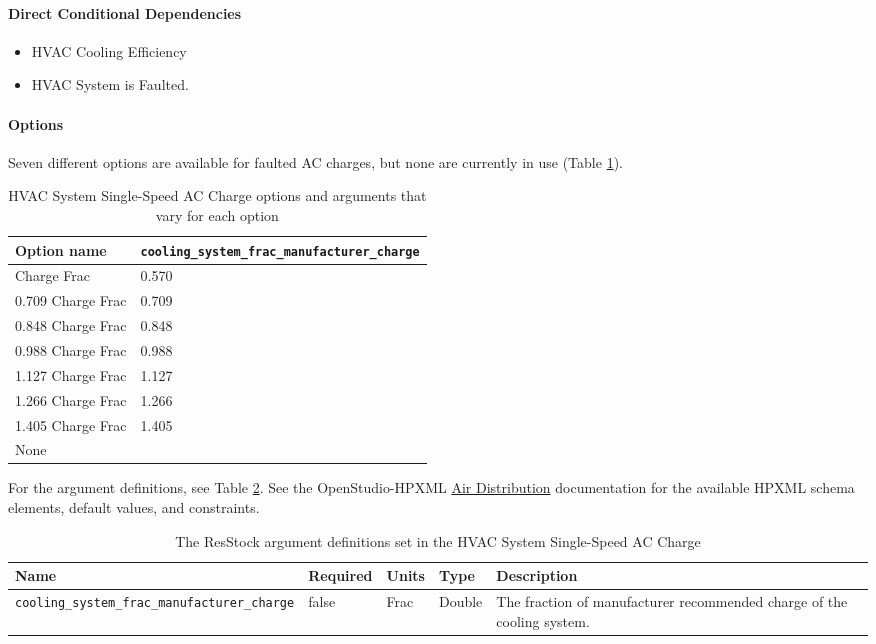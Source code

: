 \paragraph{Direct Conditional Dependencies}
\begin{itemize}
    \item HVAC Cooling Efficiency
    \item HVAC System is Faulted.
\end{itemize}

\paragraph{Options}
Seven different options are available for faulted AC charges, but none are currently in use (Table \ref{table:hc_opt_ss_ac_charge}). 

\begin{longtable}[]{|p{3.5cm}|p{6cm}|}\caption{HVAC System Single-Speed AC Charge options and arguments that vary for each option} \label{table:hc_opt_ss_ac_charge} \\
\toprule\noalign{}
Option name &
\texttt{cooling\_system\_frac\_manufacturer\_charge} \\
\midrule\noalign{}
\endhead
\bottomrule\noalign{}
\endlastfoot
0.570 Charge Frac & 0.570 \\
0.709 Charge Frac & 0.709 \\
0.848 Charge Frac & 0.848 \\
0.988 Charge Frac & 0.988 \\
1.127 Charge Frac & 1.127 \\
1.266 Charge Frac & 1.266 \\
1.405 Charge Frac & 1.405 \\
None & \\
\end{longtable}

For the argument definitions, see Table \ref{table:hc_arg_def_hvac_ss_ac_charge}. See the OpenStudio-HPXML \href{https://openstudio-hpxml.readthedocs.io/en/v1.8.1/workflow_inputs.html#hpxml-air-distribution}{Air Distribution} documentation for the available HPXML schema elements, default values, and constraints.

\begin{longtable}[]{|p{3.5cm}|p{1.5cm}|p{1.3cm}|p{1.1cm}|p{3.3cm}|} \caption{The ResStock argument definitions set in the HVAC System Single-Speed AC Charge} \label{table:hc_arg_def_hvac_ss_ac_charge}\\
\toprule\noalign{}
Name & Required & Units & Type & Description \\
\midrule\noalign{}
\endhead
\bottomrule\noalign{}
\endlastfoot
\texttt{cooling\_system\_frac\_manufacturer\_charge} & false & Frac &
Double & The fraction of manufacturer recommended charge of the
cooling system. \\
\end{longtable}
